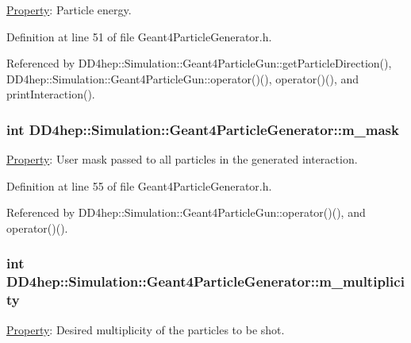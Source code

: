 \hyperlink{class_d_d4hep_1_1_property}{Property}: Particle energy. 

Definition at line 51 of file Geant4ParticleGenerator.h.

Referenced by DD4hep::Simulation::Geant4ParticleGun::getParticleDirection(), DD4hep::Simulation::Geant4ParticleGun::operator()(), operator()(), and printInteraction().\hypertarget{class_d_d4hep_1_1_simulation_1_1_geant4_particle_generator_a725064da51fefbd1410e0d0e5292d6c8}{
\subsubsection[{m\_\-mask}]{\setlength{\rightskip}{0pt plus 5cm}int {\bf DD4hep::Simulation::Geant4ParticleGenerator::m\_\-mask}}}
\label{class_d_d4hep_1_1_simulation_1_1_geant4_particle_generator_a725064da51fefbd1410e0d0e5292d6c8}


\hyperlink{class_d_d4hep_1_1_property}{Property}: User mask passed to all particles in the generated interaction. 

Definition at line 55 of file Geant4ParticleGenerator.h.

Referenced by DD4hep::Simulation::Geant4ParticleGun::operator()(), and operator()().\hypertarget{class_d_d4hep_1_1_simulation_1_1_geant4_particle_generator_a366bf41f1de7a3e605ec7f2ecc220b39}{
\subsubsection[{m\_\-multiplicity}]{\setlength{\rightskip}{0pt plus 5cm}int {\bf DD4hep::Simulation::Geant4ParticleGenerator::m\_\-multiplicity}}}
\label{class_d_d4hep_1_1_simulation_1_1_geant4_particle_generator_a366bf41f1de7a3e605ec7f2ecc220b39}


\hyperlink{class_d_d4hep_1_1_property}{Property}: Desired multiplicity of the particles to be shot. 


